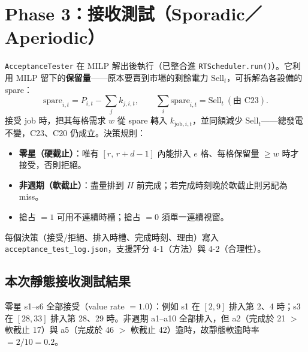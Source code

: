 \documentclass[12pt,a4paper,fontset=none]{ctexart}
\newcommand{\fn}[1]{\texttt{\small #1}}
\begin{document}
\section{Phase 3：接收測試（Sporadic／Aperiodic）}
\fn{AcceptanceTester} 在 MILP 解出後執行（已整合進 \fn{RTScheduler.run()}）。它利用 MILP 留下的\textbf{保留量}——原本要賣到市場的剩餘電力 $\mathrm{Sell}_t$，可拆解為各設備的 spare：
\begin{equation}
\mathrm{spare}_{i,t}=P_{i,t}-\textstyle\sum_{j}k_{j,i,t},\qquad \sum_i \mathrm{spare}_{i,t}=\mathrm{Sell}_t\ (\text{由 C23}).
\end{equation}
接受 job 時，把其每格需求 $w$ 從 spare 轉入 $k_{\text{job},i,t}$，並同額減少 $\mathrm{Sell}_t$——總發電不變，C23、C20 仍成立。決策規則：
\begin{itemize}
  \item \textbf{零星（硬截止）}：唯有 $[r,\,r+d-1]$ 內能排入 $e$ 格、每格保留量 $\ge w$ 時才接受，否則拒絕。
  \item \textbf{非週期（軟截止）}：盡量排到 $H$ 前完成；若完成時刻晚於軟截止則另記為 miss。
  \item 搶占 $=1$ 可用不連續時槽；搶占 $=0$ 須單一連續視窗。
\end{itemize}
每個決策（接受/拒絕、排入時槽、完成時刻、理由）寫入 \fn{acceptance\_test\_log.json}，支援評分 4-1（方法）與 4-2（合理性）。

\subsection{本次靜態接收測試結果}
零星 s1--s6 全部接受（value rate $=1.0$）：例如 s1 在 $[2,9]$ 排入第 2、4 時；s3 在 $[28,33]$ 排入第 28、29 時。非週期 a1--a10 全部排入，但 a2（完成於 21 $>$ 軟截止 17）與 a5（完成於 46 $>$ 軟截止 42）逾時，故靜態軟逾時率 $=2/10=0.2$。

\end{document}
